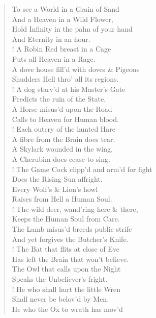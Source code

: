 \documentclass[9pt]{extarticle}
\begin{document}
\begin{verse}
	\begin{altverse} 
		
		To see a World in a Grain of Sand\\
		And a Heaven in a Wild Flower,\\
		Hold Infinity in the palm of your hand\\
		And Eternity in an hour.\\
		!
		A Robin Red breast in a Cage\\
		Puts all Heaven in a Rage.\\
		A dove house fill'd with doves \& Pigeons\\
		Shudders Hell thro' all its regions.\\
		!
		A dog starv'd at his Master's Gate\\
		Predicts the ruin of the State.\\
		A Horse misus'd upon the Road\\
		Calls to Heaven for Human blood.\\
		!
		Each outcry of the hunted Hare\\
		A fibre from the Brain does tear.\\
		A Skylark wounded in the wing,\\
		A Cherubim does cease to sing.\\
		!
		The Game Cock clipp'd and arm'd for fight\\
		Does the Rising Sun affright.\\
		Every Wolf's \& Lion's howl\\
		Raises from Hell a Human Soul.\\
		!
		The wild deer, wand'ring here \& there,\\
		Keeps the Human Soul from Care.\\
		The Lamb misus'd breeds public strife\\
		And yet forgives the Butcher's Knife.\\
		!
		The Bat that flits at close of Eve\\
		Has left the Brain that won't believe.\\
		The Owl that calls upon the Night\\
		Speaks the Unbeliever's fright.\\
		!
		He who shall hurt the little Wren\\
		Shall never be belov'd by Men.\\
		He who the Ox to wrath has mov'd\\

\end{altverse}
\end{verse}
\end{document}
